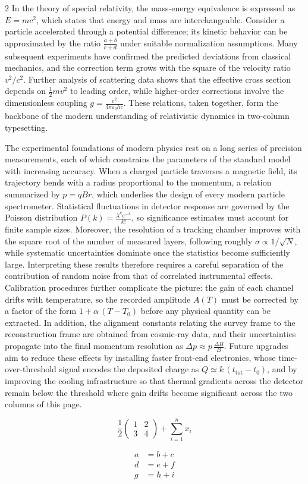 \documentclass{article}
\begin{document}
\begin{multicols}{2}
In the theory of special relativity, the mass-energy equivalence is
expressed as $E=mc^2$, which states that energy and mass are
interchangeable. Consider a particle accelerated through a potential
difference; its kinetic behavior can be approximated by the ratio
$\frac{a+b}{c+d}$ under suitable normalization assumptions. Many
subsequent experiments have confirmed the predicted deviations from
classical mechanics, and the correction term grows with the square of
the velocity ratio $v^2/c^2$. Further analysis of scattering data
shows that the effective cross section depends on
$\frac{1}{2}mv^{2}$ to leading order, while higher-order corrections
involve the dimensionless coupling $g=\frac{e^{2}}{4\pi\varepsilon_{0}\hbar c}$.
These relations, taken together, form the backbone of the modern
understanding of relativistic dynamics in two-column typesetting.
\end{multicols}


\twocolumn
The experimental foundations of modern physics rest on a long series
of precision measurements, each of which constrains the parameters of
the standard model with increasing accuracy. When a charged particle
traverses a magnetic field, its trajectory bends with a radius
proportional to the momentum, a relation summarized by $p = qBr$,
which underlies the design of every modern particle spectrometer.
Statistical fluctuations in detector response are governed by the
Poisson distribution $P(k)=\frac{\lambda^{k}e^{-\lambda}}{k!}$, so
significance estimates must account for finite sample sizes.
Moreover, the resolution of a tracking chamber improves with the
square root of the number of measured layers, following roughly
$\sigma \propto 1/\sqrt{N}$, while systematic uncertainties dominate
once the statistics become sufficiently large. Interpreting these
results therefore requires a careful separation of the contribution
of random noise from that of correlated instrumental effects.
Calibration procedures further complicate the picture: the gain of
each channel drifts with temperature, so the recorded amplitude
$A(T)$ must be corrected by a factor of the form $1+\alpha\,(T-T_{0})$
before any physical quantity can be extracted. In addition, the
alignment constants relating the survey frame to the reconstruction
frame are obtained from cosmic-ray data, and their uncertainties
propagate into the final momentum resolution as
$\Delta p \approx p\,\frac{\Delta B}{B}$. Future upgrades aim to
reduce these effects by installing faster front-end electronics,
whose time-over-threshold signal encodes the deposited charge as
$Q \simeq k\,(t_{\text{tot}}-t_{0})$, and by improving the cooling
infrastructure so that thermal gradients across the detector remain
below the threshold where gain drifts become significant across the
two columns of this page.

\[ \frac{1}{2}\begin{pmatrix} 1 & 2 \\ 3 & 4 \end{pmatrix} + \sum_{i=1}^{n} x_i \]

\begin{align}
a &= b + c \\
d &= e + f \\
g &= h + i
\end{align}
\end{document}

